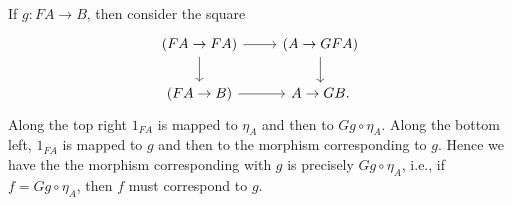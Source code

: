 If $g\colon FA\to B$, then consider the square
\[\begin{tikzcd}
	(FA\to FA)\ar[r]\ar[d] & (A\to GFA)\ar[d]\\
	(FA\to B)\ar[r] & A\to GB.
\end{tikzcd}\]
Along the top right $1_{FA}$ is mapped to $\eta_A$ and then to
$Gg \circ \eta_A$. Along the bottom left, $1_{FA}$ is mapped to
$g$ and then to the morphism corresponding to $g$. Hence we have the the
morphism corresponding with $g$ is precisely $Gg \circ \eta_A$, i.e.,
if $f = Gg \circ \eta_A$, then $f$ must correspond to $g$.
